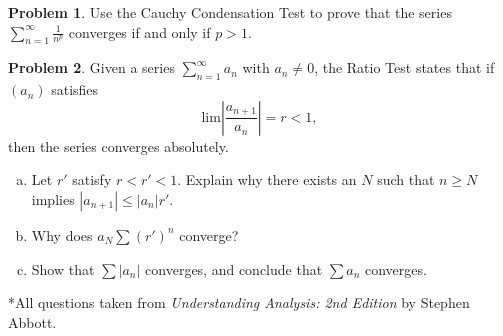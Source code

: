 \documentclass{amsart}
\newcommand{\+}[1]{\ensuremath{\mathbf{#1}}}
\theoremstyle{definition}
\newtheorem{prob}{Problem}
\begin{document}
\begin{prob}
 Use the Cauchy Condensation Test to prove that the series $\sum^{\infty}_{n=1} \frac{1}{n^p}$
 converges if and only if $p >1$.
\end{prob}

\begin{prob}
 Given a series $\sum^{\infty}_{n=1}a_n$ with $a_n \neq 0$,
 the Ratio Test states that if $(a_n)$ satisfies
 \[
 \text{lim}\left|\frac{a_{n+1}}{a_n}\right| = r < 1,
 \]
 then the series converges absolutely.
 \begin{enumerate}[(a)]
  \item Let $r'$ satisfy $r < r' < 1$.  Explain
  why there exists an $N$ such that $n \geq N$
  implies $|a_{n+1}| \leq |a_n|r'$.
  \item Why does $a_N \sum(r')^n$ converge?
  \item Show that $\sum |a_n|$ converges,
  and conclude that $\sum a_n$ converges. 
 \end{enumerate}
\end{prob}

\vspace{10mm}


*All questions taken from \emph{Understanding Analysis: 2nd Edition} by Stephen Abbott.
\end{document}
